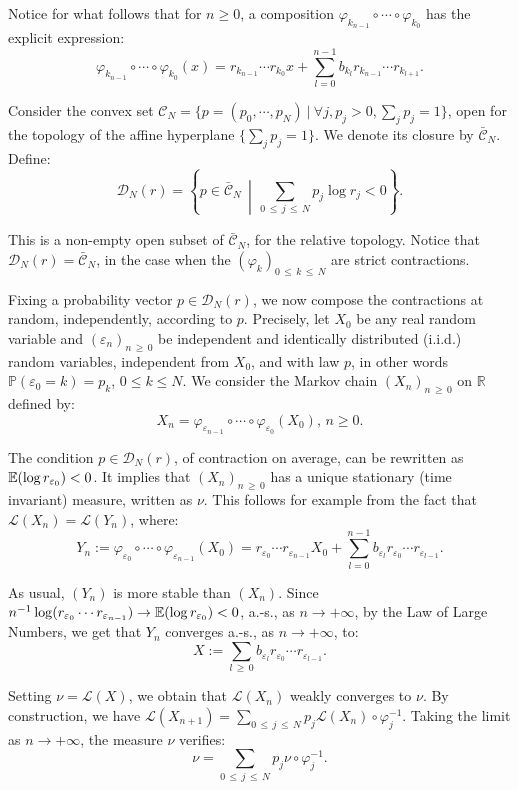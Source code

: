 \documentclass[10pt]{amsart}
\theoremstyle{definition}\newtheorem{defi}[theo]{Definition}\newtheorem{rema}[theo]{Remark}\newtheorem{exam}[theo]{Example}\newtheorem{exem}[theo]{Example}\newtheorem{nota}[theo]{Notation}
\newcommand{\Pbb}{\mathbb P}
\newcommand{\Ebb}{\mathbb E}
\newcommand{\Rbb}{\mathbb R}
\newcommand{\Lcl}{\mathcal{L}}
\newcommand{\Ccl}{\mathcal{C}}
\newcommand{\Dcl}{\mathcal{D}}
\let\oldforall\forall
\renewcommand*{\forall}{\mathrel{\oldforall}}
\begin{document}
Notice for what follows that for $n\geq0$, a composition $\varphi_{k_{n-1}}\circ \cdots \circ\varphi_{k_0}$ has the explicit expression:
\[
\varphi_{k_{n-1}}\circ \cdots \circ\varphi_{k_0}(x)=r_{k_{n-1}}\cdots r_{ k_0}x+\sum_{l=0}^{n-1}b_{k_l}r_{k_{n-1}}\cdots r_{k_{l+1}}.
\]


Consider the convex set ${\Ccl}_N=\{p=(p_0,\cdots,p_N)~|~\forall j, p_j>0, \sum_jp_j=1\}$, open for the topology of the affine hyperplane $\{\sum_jp_j=1\}$. We denote its closure by $\bar{{\Ccl}}_N$. Define:
\[
{\Dcl}_N(r)=\left\{p\in\bar{{\Ccl}}_N\,\middle|\,\sum_{0\,\leq\,j\,\leq\,N}p_j\log r_j<0\right\}.
\]


This is a non-empty open subset of $\bar{{\Ccl}}_N$, for the relative topology. Notice that ${\Dcl}_N(r)=\bar{{\Ccl}}_N$, in the case when the $(\varphi_k)_{0\,\leq\,k\,\leq\,N}$ are strict contractions.


Fixing a probability vector $p\in{\Dcl}_N(r)$, we now compose the contractions at random, independently, according to $p$. Precisely, let $X_0$ be any real random variable and $(\varepsilon_n)_{n\,\geq\,0}$ be independent and identically distributed (i.i.d.) random variables, independent from $X_0$, and with law $p$, in other words $\Pbb(\varepsilon_0=k)=p_k$, $0\leq k\leq N$. We consider the Markov chain $(X_n)_{n\,\geq\,0}$ on $\Rbb$ defined by:
\[
X_{n}=\varphi_{\varepsilon_{n-1}}\circ \cdots \circ\varphi_{\varepsilon_{0}}(X_{0}),\,n\geq0.
\]


The condition $p\in{\Dcl}_N(r)$, of contraction on average, can be rewritten as $\Ebb(\log r_{\varepsilon_0})\linebreak<0$. It implies that $(X_n)_{n\,\geq\,0}$ has a unique stationary (time invariant) measure, written as $\nu$. This follows for example from the fact that ${\Lcl}(X_n)={\Lcl}(Y_n)$, where:
\[
Y_n:=\varphi_{\varepsilon_{0}}\circ \cdots \circ\varphi_{\varepsilon_{n-1}}(X_0)=r_{\varepsilon_{0}}\cdots r_{ \varepsilon_{n-1}}X_0+\sum_{l=0}^{n-1}b_{\varepsilon_l}r_{\varepsilon_{0}}\cdots r_{\varepsilon_{l-1}}.
\]

As usual, $(Y_n)$ is more stable than $(X_n)$. Since $n^{-1}\log(r_{\varepsilon_0}\cdots r_{\varepsilon_{n-1}})\rightarrow\Ebb(\log r_{\varepsilon_0})\linebreak<0$, a.-s., as $n\rightarrow+\infty$, by the Law of Large Numbers, we get that $Y_n$ converges a.-s., as $n\rightarrow+\infty$, to:
\[
X:=\sum_{l\,\geq\,0}b_{\varepsilon_l}r_{\varepsilon_0}\cdots r_{\varepsilon_{l-1}}.
\]


Setting $\nu={\Lcl}(X)$, we obtain that ${\Lcl}(X_n)$ weakly converges to $\nu$. By construction, we have ${\Lcl}(X_{n+1})=\sum_{0\,\leq\,j\,\leq\,N}p_j{\Lcl}(X_n)\circ \varphi_j^{-1}$. Taking the limit as $n\rightarrow+\infty$, the measure $\nu$ verifies:
\begin{equation}\label{nun}
\nu=\sum_{0\,\leq\,j\,\leq\,N}p_j\nu\circ \varphi_j^{-1}.
\end{equation}
\end{document}
